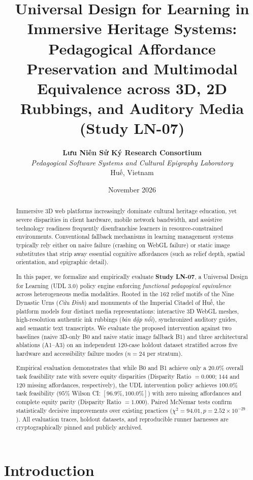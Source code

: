 \documentclass[11pt,a4paper]{article}
\title{\textbf{Universal Design for Learning in Immersive Heritage Systems:}\\
\large Pedagogical Affordance Preservation and Multimodal Equivalence across 3D, 2D Rubbings, and Auditory Media (Study LN-07)}
\author{
  \textbf{Lưu Niên Sử Ký Research Consortium}\\
  \textit{Pedagogical Software Systems and Cultural Epigraphy Laboratory}\\
  Huế, Vietnam
}
\date{November 2026}
\begin{document}
\maketitle

\begin{abstract}
Immersive 3D web platforms increasingly dominate cultural heritage education, yet severe disparities in client hardware, mobile network bandwidth, and assistive technology readiness frequently disenfranchise learners in resource-constrained environments. Conventional fallback mechanisms in learning management systems typically rely either on naive failure (crashing on WebGL failure) or static image substitutes that strip away essential cognitive affordances (such as relief depth, spatial orientation, and epigraphic detail). 

In this paper, we formalize and empirically evaluate \textbf{Study LN-07}, a Universal Design for Learning (UDL 3.0) policy engine enforcing \textit{functional pedagogical equivalence} across heterogeneous media modalities. Rooted in the 162 relief motifs of the Nine Dynastic Urns (\textit{Cửu Đỉnh}) and monuments of the Imperial Citadel of Huế, the platform models four distinct media representations: interactive 3D WebGL meshes, high-resolution authentic ink rubbings (\textit{bản dập nổi}), synchronized auditory guides, and semantic text transcripts. We evaluate the proposed intervention against two baselines (naive 3D-only B0 and naive static image fallback B1) and three architectural ablations (A1--A3) on an independent 120-case holdout dataset stratified across five hardware and accessibility failure modes ($n = 24$ per stratum). 

Empirical evaluation demonstrates that while B0 and B1 achieve only a $20.0\%$ overall task feasibility rate with severe equity disparities (Disparity Ratio $= 0.000$; 144 and 120 missing affordances, respectively), the UDL intervention policy achieves $100.0\%$ task feasibility ($95\%$ Wilson CI: $[96.9\%, 100.0\%]$) with zero missing affordances and complete equity parity (Disparity Ratio $= 1.000$). Paired McNemar tests confirm statistically decisive improvements over existing practices ($\chi^2 = 94.01, p = 2.52 \times 10^{-29}$). All evaluation traces, holdout datasets, and reproducible runner harnesses are cryptographically pinned and publicly archived.
\end{abstract}

\section{Introduction}
\end{document}
